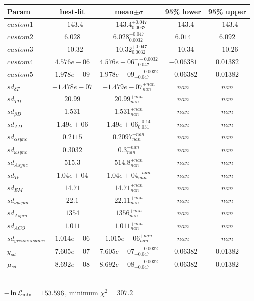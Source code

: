 \begin{tabular}{|l|c|c|c|c|} 
 \hline 
Param & best-fit & mean$\pm\sigma$ & 95\% lower & 95\% upper \\ \hline 
$custom1$ &$-143.4$ & $-143.4_{0.0032}^{+0.047}$ & $-143.4$ & $-143.4$ \\ 
$custom2$ &$6.028$ & $6.028_{0.0032}^{+0.047}$ & $6.014$ & $6.092$ \\ 
$custom3$ &$-10.32$ & $-10.32_{0.0032}^{+0.047}$ & $-10.34$ & $-10.26$ \\ 
$custom4$ &$4.576e-06$ & $4.576e-06_{-0.047}^{+-0.0032}$ & $-0.06381$ & $0.01382$ \\ 
$custom5$ &$1.978e-09$ & $1.978e-09_{-0.047}^{+-0.0032}$ & $-0.06382$ & $0.01382$ \\ 
$sd_{\delta{} T }$ &$-1.478e-07$ & $-1.479e-07_{nan}^{+nan}$ & $nan$ & $nan$ \\ 
$sd_{T D }$ &$20.99$ & $20.99_{nan}^{+nan}$ & $nan$ & $nan$ \\ 
$sd_{\beta{} D }$ &$1.531$ & $1.531_{nan}^{+nan}$ & $nan$ & $nan$ \\ 
$sd_{A D }$ &$1.49e+06$ & $1.49e+06_{0.031}^{+0.14}$ & $nan$ & $nan$ \\ 
$sd_{\alpha{} sync }$ &$0.2115$ & $0.2097_{nan}^{+nan}$ & $nan$ & $nan$ \\ 
$sd_{\omega{} sync }$ &$0.3032$ & $0.3_{nan}^{+nan}$ & $nan$ & $nan$ \\ 
$sd_{A sync }$ &$515.3$ & $514.8_{nan}^{+nan}$ & $nan$ & $nan$ \\ 
$sd_{T e }$ &$1.04e+04$ & $1.04e+04_{nan}^{+nan}$ & $nan$ & $nan$ \\ 
$sd_{EM }$ &$14.71$ & $14.71_{nan}^{+nan}$ & $nan$ & $nan$ \\ 
$sd_{\nu{} p spin }$ &$22.1$ & $22.11_{nan}^{+nan}$ & $nan$ & $nan$ \\ 
$sd_{A spin }$ &$1354$ & $1356_{nan}^{+nan}$ & $nan$ & $nan$ \\ 
$sd_{A CO }$ &$1.011$ & $1.011_{nan}^{+nan}$ & $nan$ & $nan$ \\ 
$sd_{y reio nuisance }$ &$1.014e-06$ & $1.015e-06_{nan}^{+nan}$ & $nan$ & $nan$ \\ 
$y_{sd }$ &$7.605e-07$ & $7.605e-07_{-0.047}^{+-0.0032}$ & $-0.06382$ & $0.01382$ \\ 
$\mu{}_{sd }$ &$8.692e-08$ & $8.692e-08_{-0.047}^{+-0.0032}$ & $-0.06382$ & $0.01382$ \\ 
\hline 
 \end{tabular} \\ 
$-\ln{\cal L}_\mathrm{min} =153.596$, minimum $\chi^2=307.2$ \\ 
